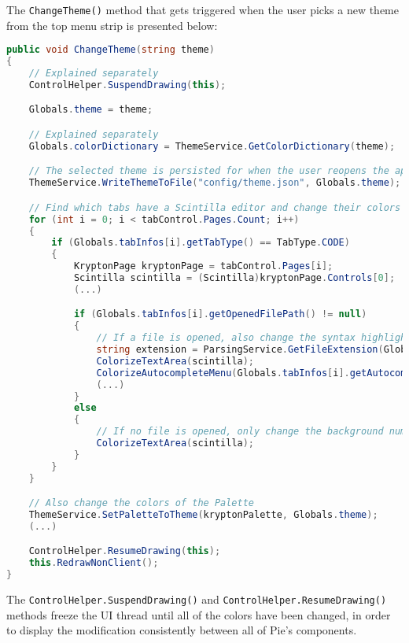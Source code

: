 The \texttt{ChangeTheme()} method that gets triggered when the user picks a new theme from the top menu strip is presented below:

\begin{lstlisting}[language=csharp, caption={The ChangeTheme() method extracts the color scheme definition of a certain theme and sets its corresponding colors to Pie's global Palette control}]
public void ChangeTheme(string theme)
{
    // Explained separately
    ControlHelper.SuspendDrawing(this);

    Globals.theme = theme;

    // Explained separately
    Globals.colorDictionary = ThemeService.GetColorDictionary(theme);

    // The selected theme is persisted for when the user reopens the application
    ThemeService.WriteThemeToFile("config/theme.json", Globals.theme);

    // Find which tabs have a Scintilla editor and change their colors too
    for (int i = 0; i < tabControl.Pages.Count; i++)
    {
        if (Globals.tabInfos[i].getTabType() == TabType.CODE)
        {
            KryptonPage kryptonPage = tabControl.Pages[i];
            Scintilla scintilla = (Scintilla)kryptonPage.Controls[0];
            (...)

            if (Globals.tabInfos[i].getOpenedFilePath() != null)
            {
                // If a file is opened, also change the syntax highlighting color and the color of the autocomplete menu
                string extension = ParsingService.GetFileExtension(Globals.tabInfos[i].getOpenedFilePath());
                ColorizeTextArea(scintilla);
                ColorizeAutocompleteMenu(Globals.tabInfos[i].getAutocompleteMenu());
                (...)
            }
            else
            {
                // If no file is opened, only change the background number margin and code folding color of Scintilla
                ColorizeTextArea(scintilla);
            }
        }
    }

    // Also change the colors of the Palette
    ThemeService.SetPaletteToTheme(kryptonPalette, Globals.theme);
    (...)

    ControlHelper.ResumeDrawing(this);
    this.RedrawNonClient();
}
\end{lstlisting}

The \texttt{ControlHelper.SuspendDrawing()} and \texttt{ControlHelper.ResumeDrawing()} methods freeze the UI thread until all of the colors have been changed, in order to display the modification consistently between all of Pie's components. 

